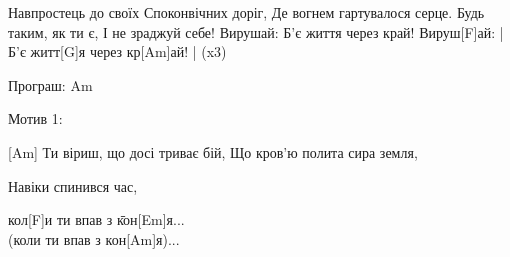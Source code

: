 \begin{guitar}
\begin{flushleft}
Навпростець до своїх
Споконвічних доріг,
Де вогнем гартувалося серце.
Будь таким, як ти є,
І не зраджуй себе!
Вирушай:
Б'є життя через край!
Вируш[F]ай:                  |
Б'є житт[G]я через кр[Am]ай! | (x3)

Програш: Am

Мотив 1:

[Am] Ти віриш, що досі триває бій,
Що кров'ю полита сира земля,

Навіки спинився час,
\begin{tabbing}
кол[F]и ти впав з \=кон[Em]я... \\
                 \>(коли ти впав з кон[Am]я)...\\
\end{tabbing}
\end{flushleft}
\end{guitar}


